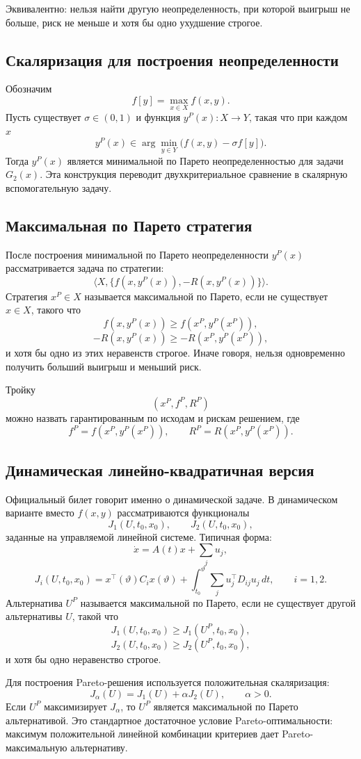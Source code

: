 \documentclass[12pt,a4paper]{article}
\begin{document}
Эквивалентно: нельзя найти другую неопределенность, при которой выигрыш не больше, риск не меньше и хотя бы одно ухудшение строгое.

\subsection*{Скаляризация для построения неопределенности}
Обозначим
\[
f[y]=\max_{x\in X}f(x,y).
\]
Пусть существует \(\sigma\in(0,1)\) и функция \(y^P(x):X\to Y\), такая что при каждом \(x\)
\[
y^P(x)\in \arg\min_{y\in Y}\bigl(f(x,y)-\sigma f[y]\bigr).
\]
Тогда \(y^P(x)\) является минимальной по Парето неопределенностью для задачи \(G_2(x)\). Эта конструкция переводит двухкритериальное сравнение в скалярную вспомогательную задачу.

\subsection*{Максимальная по Парето стратегия}
После построения минимальной по Парето неопределенности \(y^P(x)\) рассматривается задача по стратегии:
\[
\langle X,\{f(x,y^P(x)),-R(x,y^P(x))\}\rangle.
\]
Стратегия \(x^P\in X\) называется максимальной по Парето, если не существует \(x\in X\), такого что
\[
f(x,y^P(x))\ge f(x^P,y^P(x^P)),
\]
\[
-R(x,y^P(x))\ge -R(x^P,y^P(x^P)),
\]
и хотя бы одно из этих неравенств строгое. Иначе говоря, нельзя одновременно получить больший выигрыш и меньший риск.

Тройку
\[
(x^P,f^P,R^P)
\]
можно назвать гарантированным по исходам и рискам решением, где
\[
f^P=f(x^P,y^P(x^P)),
\qquad
R^P=R(x^P,y^P(x^P)).
\]

\subsection*{Динамическая линейно-квадратичная версия}
Официальный билет говорит именно о динамической задаче. В динамическом варианте вместо \(f(x,y)\) рассматриваются функционалы
\[
J_1(U,t_0,x_0),
\qquad
J_2(U,t_0,x_0),
\]
заданные на управляемой линейной системе. Типичная форма:
\[
\dot x=A(t)x+\sum_j u_j,
\]
\[
J_i(U,t_0,x_0)=x^{\top}(\vartheta)C_i x(\vartheta)+
\int_{t_0}^{\vartheta}\sum_j u_j^{\top} D_{ij}u_j\,dt,
\qquad i=1,2.
\]
Альтернатива \(U^P\) называется максимальной по Парето, если не существует другой альтернативы \(U\), такой что
\[
J_1(U,t_0,x_0)\ge J_1(U^P,t_0,x_0),
\]
\[
J_2(U,t_0,x_0)\ge J_2(U^P,t_0,x_0),
\]
и хотя бы одно неравенство строгое.

Для построения Pareto-решения используется положительная скаляризация:
\[
J_\alpha(U)=J_1(U)+\alpha J_2(U),
\qquad \alpha>0.
\]
Если \(U^P\) максимизирует \(J_\alpha\), то \(U^P\) является максимальной по Парето альтернативой. Это стандартное достаточное условие Pareto-оптимальности: максимум положительной линейной комбинации критериев дает Pareto-максимальную альтернативу.
\end{document}
